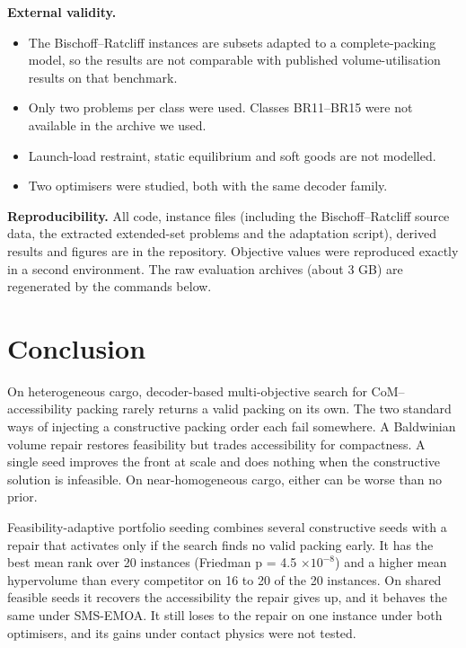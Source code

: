 \documentclass[journal]{IEEEtran}
\providecommand{\tightlist}{\setlength{\itemsep}{0pt}\setlength{\parskip}{0pt}}
\begin{document}
\textbf{External validity.}

\begin{itemize}
\tightlist
\item
  The Bischoff--Ratcliff instances are subsets adapted to a complete-packing model, so the results are not comparable with published volume-utilisation results on that benchmark.
\item
  Only two problems per class were used. Classes BR11--BR15 were not available in the archive we used.
\item
  Launch-load restraint, static equilibrium \cite{ramos2016} and soft goods are not modelled.
\item
  Two optimisers were studied, both with the same decoder family.
\end{itemize}

\textbf{Reproducibility.} All code, instance files (including the Bischoff--Ratcliff source data, the extracted extended-set problems and the adaptation script), derived results and figures are in the repository. Objective values were reproduced exactly in a second environment. The raw evaluation archives (about 3 GB) are regenerated by the commands below.

\section{Conclusion}\label{sec:9}

On heterogeneous cargo, decoder-based multi-objective search for CoM--accessibility packing rarely returns a valid packing on its own. The two standard ways of injecting a constructive packing order each fail somewhere. A Baldwinian volume repair restores feasibility but trades accessibility for compactness. A single seed improves the front at scale and does nothing when the constructive solution is infeasible. On near-homogeneous cargo, either can be worse than no prior.

Feasibility-adaptive portfolio seeding combines several constructive seeds with a repair that activates only if the search finds no valid packing early. It has the best mean rank over 20 instances (Friedman p = 4.5 \(\times 10^{-8}\)) and a higher mean hypervolume than every competitor on 16 to 20 of the 20 instances. On shared feasible seeds it recovers the accessibility the repair gives up, and it behaves the same under SMS-EMOA. It still loses to the repair on one instance under both optimisers, and its gains under contact physics were not tested.
\end{document}
